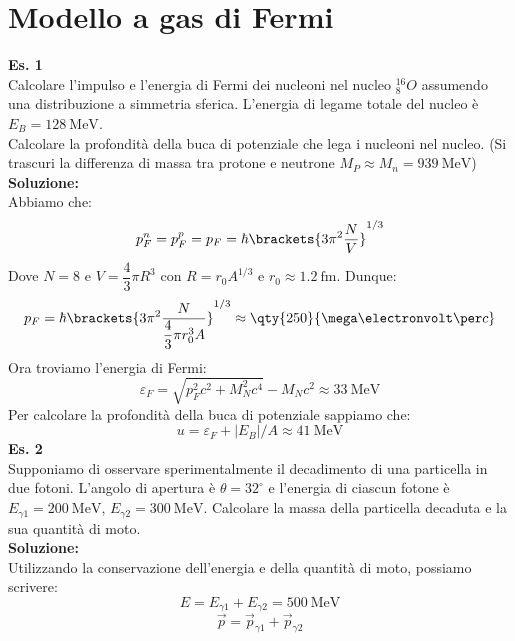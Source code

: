 \section{Modello a gas di Fermi}
\textbf{Es. 1}\\
Calcolare l'impulso e l'energia di Fermi dei nucleoni nel nucleo $^{16}_8O$ assumendo una distribuzione a simmetria sferica. L'energia di legame totale del nucleo è $E_B = \qty{128}{\mega\electronvolt}$.\\
Calcolare la profondità della buca di potenziale che lega i nucleoni nel nucleo. (Si trascuri la differenza di massa tra protone e neutrone $M_P \approx M_n = \qty{939}{\mega\electronvolt}$)\\
\textbf{Soluzione:}\\
Abbiamo che:
\begin{equation}
 p^n_F = p^p_F = p_F = \hbar \brackets{3 \pi^2 \dfrac{N}{V}}^{1/3}
\end{equation}
Dove $N = 8$ e $V = \dfrac{4}{3} \pi R^3$ con $R = r_0 A^{1/3}$ e $r_0 \approx \qty{1.2}{\femto\meter}$. Dunque:
\begin{equation}
 p_F = \hbar \brackets{3 \pi^2 \dfrac{N}{\dfrac{4}{3} \pi r_0^3 A}}^{1/3} \approx \qty{250}{\mega\electronvolt\per c}
\end{equation}
Ora troviamo l'energia di Fermi:
\begin{equation}
 \varepsilon_F = \sqrt{p_F^2 c^2 + M_N^2 c^4} - M_N c^2 \approx \qty{33}{\mega\electronvolt}
\end{equation}
Per calcolare la profondità della buca di potenziale sappiamo che:
\begin{equation}
  u = \varepsilon_F + |E_B|/A \approx \qty{41}{\mega\electronvolt}
\end{equation}
\textbf{Es. 2}\\
Supponiamo di osservare sperimentalmente il decadimento di una particella in due fotoni. L'angolo di apertura è $\theta = 32^\circ$ e l'energia di ciascun fotone è $E_{\gamma1} = \qty{200}{\mega\electronvolt}$, $E_{\gamma2} = \qty{300}{\mega\electronvolt}$. Calcolare la massa della particella decaduta e la sua quantità di moto.\\
\textbf{Soluzione:}\\
Utilizzando la conservazione dell'energia e della quantità di moto, possiamo scrivere:
\begin{equation}
 E = E_{\gamma1} + E_{\gamma2} = \qty{500}{\mega\electronvolt}
\end{equation}
\begin{equation}
 \vec{p} = \vec{p}_{\gamma1} + \vec{p}_{\gamma2}
\end{equation}
